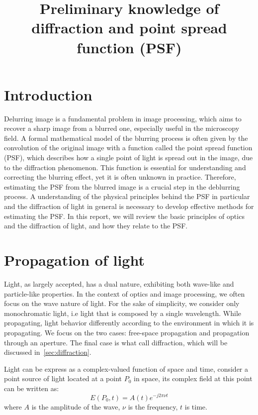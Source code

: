 \documentclass{article}
\begin{document}
\title{Preliminary knowledge of diffraction and point spread function (PSF)}
\maketitle
\tableofcontents

\section{Introduction}
Delurring image is a fundamental problem in image processing, which aims to recover a sharp image from a blurred one, especially useful in the microscopy field.
A formal mathematical model of the blurring process is often given by the convolution of the original image with a function called the point spread function (PSF), which describes how a single point of light is spread out in the image, due to the diffraction phenomenon. This function is essential for understanding and correcting the blurring effect, yet it is often unknown in practice. Therefore, estimating the PSF from the blurred image is a crucial step in the deblurring process. A understanding of the physical principles behind the PSF in particular and the diffraction of light in general is necessary to develop effective methods for estimating the PSF. In this report, we will review the basic principles of optics and the diffraction of light, and how they relate to the PSF.

\section{Propagation of light}
Light, as largely accepted, has a dual nature, exhibiting both wave-like and particle-like properties.
In the context of optics and image processing, we often focus on the wave nature of light.
For the sake of simplicity, we consider only monochromatic light, i.e light that is composed by a single wavelength.
While propagating, light behavior differently according to the environment in which it is propagating.
We focus on the two cases: free-space propagation and propagation through an aperture. The final case is what call diffraction, which will be discussed in~\cref{sec:diffraction}.

Light can be express as a complex-valued function of space and time, consider a point source of light located at a point $P_0$ in space, its complex field at this point can be written as:
\begin{equation}\label{eq:light_field}
E(P_0, t) = A(t) e^{-j2\pi\nu t}
\end{equation}
where $A$ is the amplitude of the wave, $\nu$ is the frequency, $t$ is time.
\end{document}
